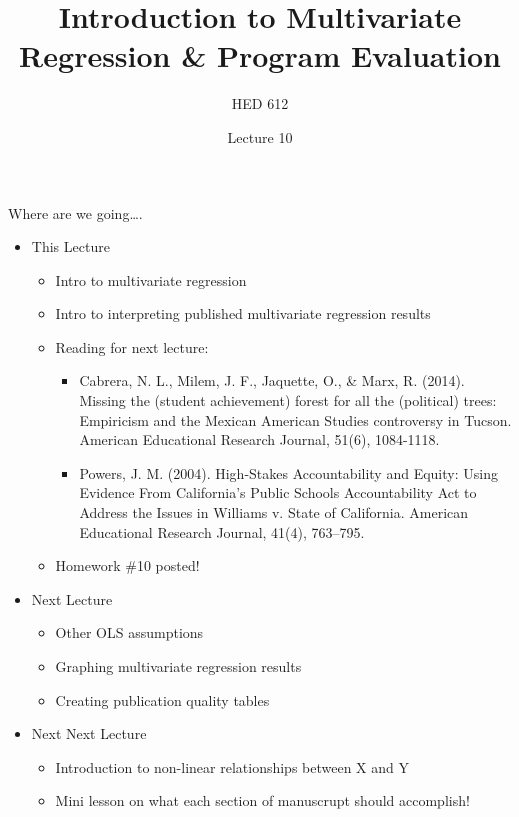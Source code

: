 \documentclass[8pt,ignorenonframetext,dvipsnames]{beamer}
\title{Introduction to Multivariate Regression \& Program Evaluation}
\subtitle{HED 612}
\author{Lecture 10}
\date{}
\providecommand{\tightlist}{%
  \setlength{\itemsep}{0pt}\setlength{\parskip}{0pt}}
\let\olditem\item
\renewcommand{\item}{%
  \olditem\vspace{4pt}
}
\begin{document}
\frame{\titlepage}

\begin{frame}
\tableofcontents[hideallsubsections]
\end{frame}
\begin{frame}{Where are we going\ldots{}.}
\protect\hypertarget{where-are-we-going.}{}

\begin{itemize}
\tightlist
\item
  This Lecture

  \begin{itemize}
  \tightlist
  \item
    Intro to multivariate regression
  \item
    Intro to interpreting published multivariate regression results
  \item
    Reading for next lecture:

    \begin{itemize}
    \tightlist
    \item
      Cabrera, N. L., Milem, J. F., Jaquette, O., \& Marx, R. (2014).
      Missing the (student achievement) forest for all the (political)
      trees: Empiricism and the Mexican American Studies controversy in
      Tucson. American Educational Research Journal, 51(6), 1084-1118.
    \item
      Powers, J. M. (2004). High-Stakes Accountability and Equity: Using
      Evidence From California's Public Schools Accountability Act to
      Address the Issues in Williams v. State of California. American
      Educational Research Journal, 41(4), 763--795.
    \end{itemize}
  \item
    Homework \#10 posted!
  \end{itemize}
\item
  Next Lecture

  \begin{itemize}
  \tightlist
  \item
    Other OLS assumptions
  \item
    Graphing multivariate regression results
  \item
    Creating publication quality tables
  \end{itemize}
\item
  Next Next Lecture

  \begin{itemize}
  \tightlist
  \item
    Introduction to non-linear relationships between X and Y
  \item
    Mini lesson on what each section of manuscrupt should accomplish!
  \end{itemize}
\end{itemize}

\end{frame}
\end{document}
